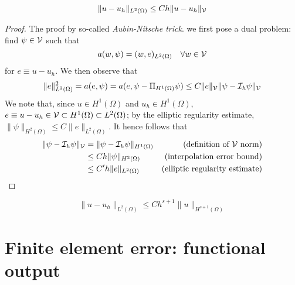 \begin{theorem}
  
\begin{align*}
  \| u - u_h \|_{L^2(\Omega)} \leq C h \| u-u_h \|_{\mathcal{V}}
\end{align*}

\begin{proof}
  The proof by so-called \emph{Aubin-Nitsche trick}. we first pose a dual problem: find $\psi \in \mathcal{V}$ such that
\begin{equation*}
  a(w,\psi) = (w,e)_{L^2(\Omega)} \quad \forall w \in \mathcal{V}
\end{equation*}
for $e \equiv u - u_h$. We then observe that
\begin{equation*}
  \| e \|_{L^2(\Omega)}^2 = a(e, \psi)
  = a(e, \psi - \Pi_{H^1(\Omega)} \psi)
  \leq C \| e \|_{\mathcal{V}} \| \psi - \mathcal{I}_h \psi \|_{\mathcal{V}}
\end{equation*}
We note that, since $u \in H^1(\Omega)$ and $u_h \in H^1(\Omega)$,  $e \equiv u - u_h \in \mathcal{V} \subset H^1(\Omega) \subset L^2(\Omega)$; by the elliptic regularity estimate, $\| \psi \|_{H^2(\Omega)} \leq C \| e \|_{L^2(\Omega)}$. It hence follows that
\begin{align*}
  \| \psi - \mathcal{I}_h \psi \|_{\mathcal{V}}
  &=\| \psi - \mathcal{I}_h \psi \|_{H^1(\Omega)} & \text{(definition of $\mathcal{V}$ norm)} \\
  &\leq C h \| \psi \|_{H^2(\Omega)} & \text{(interpolation error bound)}\\
  &\leq C' h  \| e \|_{L^2(\Omega)} & \text{(elliptic regularity estimate)}
\end{align*}
\end{proof}
\end{theorem}

\begin{corollary}
  \begin{equation*}
    \| u - u_h \|_{L^2(\Omega)} \leq C h^{s+1} \| u \|_{H^{s+1}(\Omega)}
  \end{equation*}
\end{corollary}

\section{Finite element error: functional output}

